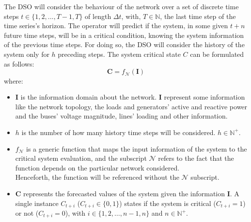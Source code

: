 The \gls{DSO} will consider the behaviour of the network over a set of discrete time steps $t \in \{1,2,...,T-1,T\}$ of length $\Delta t$, with, $T \in \mathbb{N}$, the last time step of the time series’s horizon. The operator will predict if the system, in some given $t+n$ future time steps, will be in a critical condition, knowing the system information of the previous time steps. For doing so, the \gls{DSO} will consider the history of the system only for $h$ preceding steps. The system critical state $C$ can be formulated as follows: 
\begin{equation} \label{eq:fmapping}
    \textbf{C} = f_\mathcal{N}(\textbf{I})
\end{equation}
\noindent where:
\begin{itemize}
    \item $\textbf{I}$ is the information domain about the network. %
    $\textbf{I}$ represent some information like the network topology, the loads and generators' active and reactive power and the buses' voltage magnitude, lines' loading and other information.
    
    \item $h$ is the number of how many history time steps will be considered. $h \in \mathbb{N}^+$.
    
    \item $f_\mathcal{N}$ is a generic function that maps the input information of the system to the critical system evaluation, and the subscript $\mathcal{N}$ refers to the fact that the function depends on the particular network considered. \\
    Henceforth, the function will be referenced without the $\mathcal{N}$ subscript.%
    
    \item $\textbf{C}$ represents the forecasted values of the system given the information $\textbf{I}$. A single instance $C_{t+i}$ ($C_{t+i} \in \{0,1\}$) states if the system is critical ($C_{t+i}=1$) or not ($C_{t+i}=0$), with $i \in \{1,2,\dots,n-1,n\}$ and $n \in \mathbb{N}^+$. 
\end{itemize}


